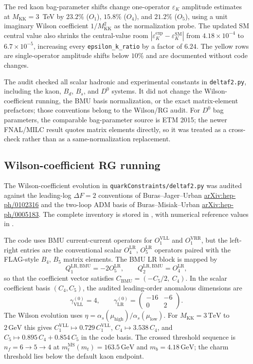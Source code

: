 \documentclass[11pt]{article}
\newcommand{\Mkk}{M_{\mathrm{KK}}}
\newcommand{\msbar}{\overline{\mathrm{MS}}}
\newcommand{\eK}{\varepsilon_K}
\begin{document}
The red kaon bag-parameter shifts change one-operator $\eK$ amplitude
estimates at $\Mkk=3$~TeV by $23.2\%$ ($O_1$), $15.8\%$ ($O_4$), and
$21.2\%$ ($O_5$), using a unit imaginary Wilson coefficient
$1/\Mkk^2$ as the normalization probe. The updated SM central value also
shrinks the central-value room
$|\eK^{\mathrm{exp}}-\eK^{\mathrm{SM}}|$ from
$4.18\times10^{-4}$ to $6.7\times10^{-5}$, increasing every
\texttt{epsilon\_k\_ratio} by a factor of $6.24$. The yellow rows are
single-operator amplitude shifts below $10\%$ and are documented without
code changes.

The audit checked all scalar hadronic and experimental constants in
\texttt{deltaf2.py}, including the kaon, $B_d$, $B_s$, and $D^0$
systems. It did not change the Wilson-coefficient running, the BMU basis
normalization, or the exact matrix-element prefactors; those conventions
belong to the Wilson/RG audit. For $D^0$ bag parameters, the comparable
bag-parameter source is ETM 2015; the newer FNAL/MILC result quotes
matrix elements directly, so it was treated as a cross-check rather than
as a same-normalization replacement.

\subsection{Wilson-coefficient RG running}
\label{app:wilson-coefficient-rg}

The Wilson-coefficient evolution in
\texttt{quarkConstraints/deltaf2.py} was audited against the
leading-log $\Delta F=2$ conventions of Buras--Jager--Urban
\href{https://arxiv.org/abs/hep-ph/0102316}{arXiv:hep-ph/0102316}
and the two-loop ADM basis of Buras--Misiak--Urban
\href{https://arxiv.org/abs/hep-ph/0005183}{arXiv:hep-ph/0005183}.
The complete inventory is stored in
, with numerical reference
values in .

The code uses BMU current-current operators for $O_1^{\mathrm{VLL}}$
and $O_1^{\mathrm{VRR}}$, but the left-right entries are the conventional
scalar $O_4^{\mathrm{LR}}$, $O_5^{\mathrm{LR}}$ operators paired with the
FLAG-style $B_4$, $B_5$ matrix elements. The BMU LR block is mapped by
\[
  Q_1^{\mathrm{LR,BMU}} = -2 O_5^{\mathrm{LR}},
  \qquad
  Q_2^{\mathrm{LR,BMU}} = O_4^{\mathrm{LR}},
\]
so that the coefficient vector satisfies
$C_{\mathrm{BMU}}=(-C_5/2,\ C_4)$.  In the scalar coefficient basis
$(C_4,C_5)$, the audited leading-order anomalous dimensions are
\[
  \gamma_{\mathrm{VLL}}^{(0)} = 4,\qquad
  \gamma_{\mathrm{LR}}^{(0)} =
  \begin{pmatrix}
    -16 & -6 \\
      0 & 2
  \end{pmatrix}.
\]
The Wilson evolution uses
$\eta=\alpha_s(\mu_{\mathrm{high}})/\alpha_s(\mu_{\mathrm{low}})$.
For $\Mkk=3\,\mathrm{TeV}$ to $2\,\mathrm{GeV}$ this gives
$C_1^{\mathrm{VLL}}\mapsto0.729\,C_1^{\mathrm{VLL}}$,
$C_4\mapsto3.538\,C_4$, and
$C_5\mapsto0.895\,C_4+0.854\,C_5$ in the code basis.  The crossed
threshold sequence is $n_f=6\to5\to4$ at
$m_t^{\msbar}(m_t)=163.5\,\mathrm{GeV}$ and
$m_b=4.18\,\mathrm{GeV}$; the charm
threshold lies below the default kaon endpoint.
\end{document}
